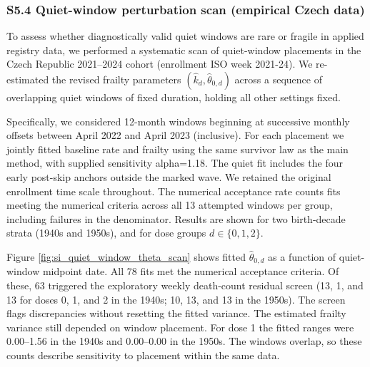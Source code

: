 \documentclass[
]{article}
\begin{document}
\subsubsection{S5.4 Quiet-window perturbation scan (empirical Czech data)}\label{s5.4-quiet-window-perturbation-scan-empirical-czech-data}

To assess whether diagnostically valid quiet windows are rare or fragile in applied registry data, we performed a systematic scan of quiet-window placements in the Czech Republic 2021--2024 cohort (enrollment ISO week 2021-24). We re-estimated the revised frailty parameters \((\hat{k}_d,\hat{\theta}_{0,d})\) across a sequence of overlapping quiet windows of fixed duration, holding all other settings fixed.

Specifically, we considered 12-month windows beginning at successive monthly offsets between April 2022 and April 2023 (inclusive). For each placement we jointly fitted baseline rate and frailty using the same survivor law as the main method, with supplied sensitivity alpha=1.18. The quiet fit includes the four early post-skip anchors outside the marked wave. We retained the original enrollment time scale throughout. The numerical acceptance rate counts fits meeting the numerical criteria across all 13 attempted windows per group, including failures in the denominator. Results are shown for two birth-decade strata (1940s and 1950s), and for dose groups \(d \in \{0,1,2\}\).

Figure \ref{fig:si_quiet_window_theta_scan} shows fitted \(\hat{\theta}_{0,d}\) as a function of quiet-window midpoint date. All 78 fits met the numerical acceptance criteria. Of these, 63 triggered the exploratory weekly death-count residual screen (13, 1, and 13 for doses 0, 1, and 2 in the 1940s; 10, 13, and 13 in the 1950s). The screen flags discrepancies without resetting the fitted variance. The estimated frailty variance still depended on window placement. For dose 1 the fitted ranges were 0.00--1.56 in the 1940s and 0.00--0.00 in the 1950s. The windows overlap, so these counts describe sensitivity to placement within the same data.
\end{document}

